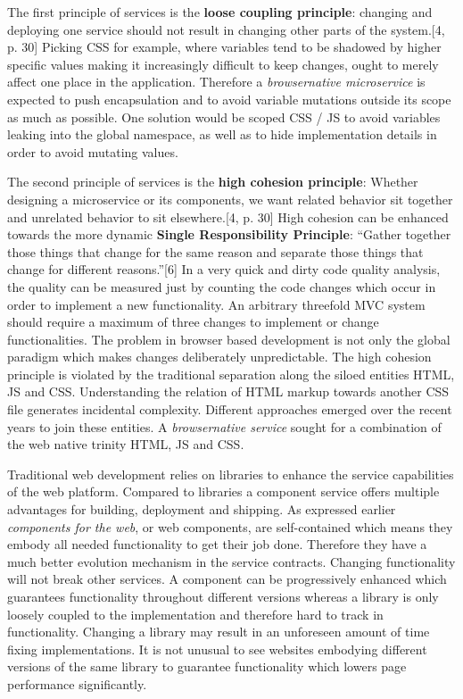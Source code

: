 \documentclass[]{article}
\begin{document}
The first principle of services is the \textbf{loose coupling
principle}: changing and deploying one service should not result in
changing other parts of the system.{[}4, p. 30{]} Picking CSS for
example, where variables tend to be shadowed by higher specific values
making it increasingly difficult to keep changes, ought to merely affect
one place in the application. Therefore a \emph{browsernative
microservice} is expected to push encapsulation and to avoid variable
mutations outside its scope as much as possible. One solution would be
scoped CSS / JS to avoid variables leaking into the global namespace, as
well as to hide implementation details in order to avoid mutating
values.

The second principle of services is the \textbf{high cohesion
principle}: Whether designing a microservice or its components, we want
related behavior sit together and unrelated behavior to sit
elsewhere.{[}4, p. 30{]} High cohesion can be enhanced towards the more
dynamic \textbf{Single Responsibility Principle}: ``Gather together
those things that change for the same reason and separate those things
that change for different reasons.''{[}6{]} In a very quick and dirty
code quality analysis, the quality can be measured just by counting the
code changes which occur in order to implement a new functionality. An
arbitrary threefold MVC system should require a maximum of three changes
to implement or change functionalities. The problem in browser based
development is not only the global paradigm which makes changes
deliberately unpredictable. The high cohesion principle is violated by
the traditional separation along the siloed entities HTML, JS and CSS.
Understanding the relation of HTML markup towards another CSS file
generates incidental complexity. Different approaches emerged over the
recent years to join these entities. A \emph{browsernative service}
sought for a combination of the web native trinity HTML, JS and CSS.

Traditional web development relies on libraries to enhance the service
capabilities of the web platform. Compared to libraries a component
service offers multiple advantages for building, deployment and
shipping. As expressed earlier \emph{components for the web}, or web
components, are self-contained which means they embody all needed
functionality to get their job done. Therefore they have a much better
evolution mechanism in the service contracts. Changing functionality
will not break other services. A component can be progressively enhanced
which guarantees functionality throughout different versions whereas a
library is only loosely coupled to the implementation and therefore hard
to track in functionality. Changing a library may result in an
unforeseen amount of time fixing implementations. It is not unusual to
see websites embodying different versions of the same library to
guarantee functionality which lowers page performance significantly.
\end{document}
